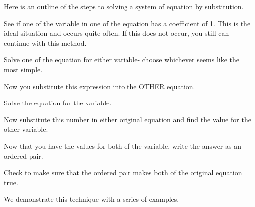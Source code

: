 Here is an outline of the steps to solving a system of equation by substitution.
\begin{steps}
	\item See if one of the variable in one of the equation has a coefficient of 1. This is the ideal
	situation and occurs quite often. If this does not occur, you still can continue with this
	method.
	\item Solve one of the equation for either variable- choose whichever seems like the most
	simple.
	\item Now you substitute this \gls{expression} into the OTHER equation.
	\item Solve the equation for the variable.
	\item Now substitute this number in either original equation and find the value for the other
	variable.
	\item Now that you have the values for both of the variable, write the answer as an ordered pair.
	\item Check to make sure that the ordered pair makes both of the original equation true.
\end{steps}
We demonstrate this technique with a series of examples.
																											

